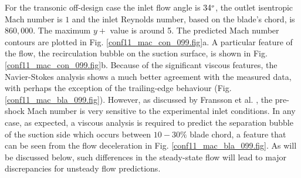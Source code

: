  For the transonic off-design case the inlet flow angle is $34^{\mbox{\tiny $o$}}$,
 the outlet isentropic Mach number is $1$ and the inlet Reynolds number,
 based on the blade's chord, is $860,000$. The maximum $y+$ value is around 5.
 The predicted Mach number contours are plotted in Fig. \ref{conf11_mac_con_099.fig}a.
 A particular feature of the flow, the recirculation bubble on the suction
 surface, is shown in Fig. \ref{conf11_mac_con_099.fig}b.
 Because of the significant viscous features,
 the Navier-Stokes analysis shows a much better agreement
 with the measured data, with perhaps the exception of the trailing-edge behaviour
 (Fig. \ref{conf11_mac_bla_099.fig}).
 However, as discussed by Fransson et al. \citeyear{Bolcs:2}, the pre-shock
 Mach number is very sensitive to the experimental inlet conditions.
 In any case, as expected, a viscous
 analysis is required to predict  the separation bubble of the suction side which
 occurs between $10-30\%$  blade chord, a feature that can be seen from  the flow
 deceleration in Fig. \ref{conf11_mac_bla_099.fig}. As will be discussed below,
 such differences in the steady-state flow will lead to major
 discrepancies for unsteady flow predictions.
%
